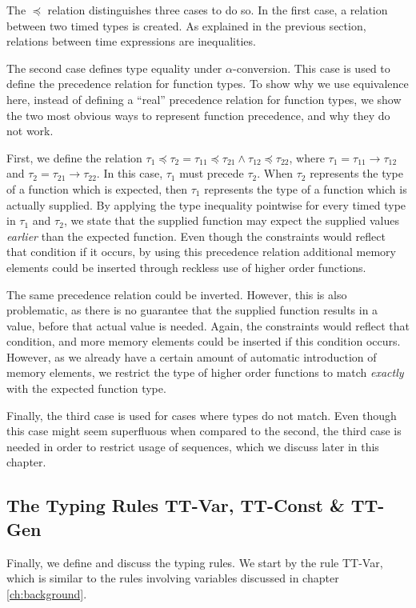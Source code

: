 The $\preceq$ relation distinguishes three cases to do so.
In the first case, a relation between two timed types is created.
As explained in the previous section, relations between time expressions are inequalities.

The second case defines type equality under $\alpha$-conversion.
This case is used to define the precedence relation for function types.
To show why we use equivalence here, instead of defining a ``real'' precedence relation for function types, we show the two most obvious ways to represent function precedence, and why they do not work.

First, we define the relation $\tau_1 \preceq \tau_2 = \tau_{11} \preceq \tau_{21} \land \tau_{12} \preceq \tau_{22}$, where $\tau_1 = \tau_{11} \to \tau_{12}$ and $\tau_2 = \tau_{21} \to \tau_{22}$.
In this case, $\tau_1$ must precede $\tau_2$. 
When $\tau_2$ represents the type of a function which is expected, then $\tau_1$ represents the type of a function which is actually supplied.
By applying the type inequality pointwise for every timed type in $\tau_1$ and $\tau_2$, we state that the supplied function may expect the supplied values \textit{earlier} than the expected function.
Even though the constraints would reflect that condition if it occurs, by using this precedence relation additional memory elements could be inserted through reckless use of higher order functions.

The same precedence relation could be inverted.
However, this is also problematic, as there is no guarantee that the supplied function results in a value, before that actual value is needed.
Again, the constraints would reflect that condition, and more memory elements could be inserted if this condition occurs.
However, as we already have a certain amount of automatic introduction of memory elements, we restrict the type of higher order functions to match \textit{exactly} with the expected function type.

Finally, the third case is used for cases where types do not match. 
Even though this case might seem superfluous when compared to the second, the third case is needed in order to restrict usage of sequences, which we discuss later in this chapter.

\subsection{The Typing Rules TT-Var, TT-Const \& TT-Gen}
Finally, we define and discuss the typing rules.
We start by the rule TT-Var, which is similar to the rules involving variables discussed in chapter \ref{ch:background}.

